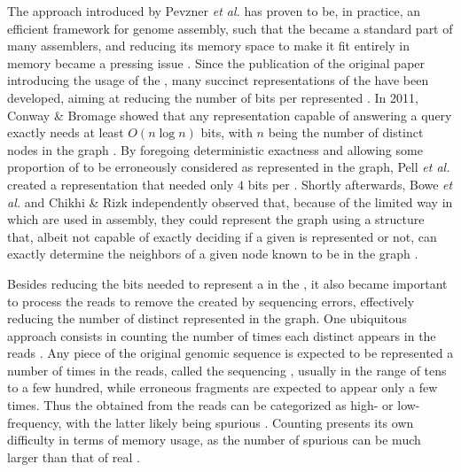 The approach introduced by Pevzner \emph{et al.} has proven to be, in practice, an efficient framework for genome assembly, such that the \dBG became a standard part of many assemblers, and reducing its memory space to make it fit entirely in memory became a pressing issue \cite{Chikhi2014}. Since the publication of the original paper introducing the usage of the \dBG{}, many succinct representations of the \dBG have been developed, aiming at reducing the number of bits per represented \kmer. In 2011, Conway \& Bromage showed that any \dBG representation capable of answering a \kmer query exactly needs at least $O(n \log n)$ bits, with $n$ being the number of distinct nodes in the graph \cite{Conway2011}. By foregoing deterministic exactness and allowing some proportion of  to be erroneously considered as represented in the graph, Pell \emph{et al.} created a representation that needed only $4$ bits per \kmer \cite{Pell2012}. Shortly afterwards, Bowe \emph{et al.} and Chikhi \& Rizk independently observed that, because of the limited way in which  are used in assembly, they could represent the graph using a structure that, albeit not capable of exactly deciding if a given \kmer is represented or not, can exactly determine the neighbors of a given node known to be in the graph \cite{Bowe2012, Chikhi2013}.

Besides reducing the bits needed to represent a \kmer in the \dBG, it also became important to process the reads to remove the  created by sequencing errors, effectively reducing the number of distinct  represented in the graph. One ubiquitous approach consists in counting the number of times each distinct \kmer appears in the reads \cite{Zhang2014}. Any piece of the original genomic sequence is expected to be represented a  number of times in the reads, called the sequencing , usually in the range of tens to a few hundred, while erroneous fragments are expected to appear only a few times. Thus the  obtained from the reads can be categorized as high- or low-frequency, with the latter likely being spurious \cite{Conway2011, Ghosh2019}. Counting \kmers presents its own difficulty in terms of memory usage, as the number of spurious  can be much larger than that of real  \cite{Conway2011, Melsted2011, Zhang2014, Ghosh2019}.

